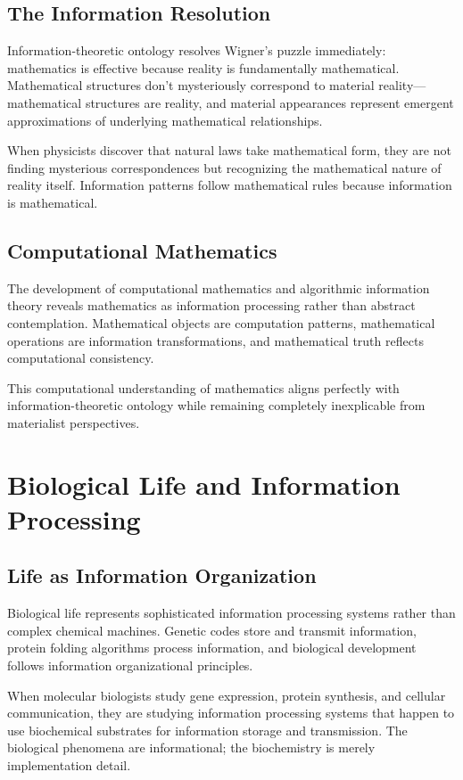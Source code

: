 \documentclass[12pt]{article}
\begin{document}
\subsection{The Information Resolution}

Information-theoretic ontology resolves Wigner's puzzle immediately: mathematics is effective because reality is fundamentally mathematical. Mathematical structures don't mysteriously correspond to material reality—mathematical structures are reality, and material appearances represent emergent approximations of underlying mathematical relationships.

When physicists discover that natural laws take mathematical form, they are not finding mysterious correspondences but recognizing the mathematical nature of reality itself. Information patterns follow mathematical rules because information is mathematical.

\subsection{Computational Mathematics}

The development of computational mathematics and algorithmic information theory reveals mathematics as information processing rather than abstract contemplation. Mathematical objects are computation patterns, mathematical operations are information transformations, and mathematical truth reflects computational consistency.

This computational understanding of mathematics aligns perfectly with information-theoretic ontology while remaining completely inexplicable from materialist perspectives.

\section{Biological Life and Information Processing}

\subsection{Life as Information Organization}

Biological life represents sophisticated information processing systems rather than complex chemical machines. Genetic codes store and transmit information, protein folding algorithms process information, and biological development follows information organizational principles.

When molecular biologists study gene expression, protein synthesis, and cellular communication, they are studying information processing systems that happen to use biochemical substrates for information storage and transmission. The biological phenomena are informational; the biochemistry is merely implementation detail.
\end{document}
